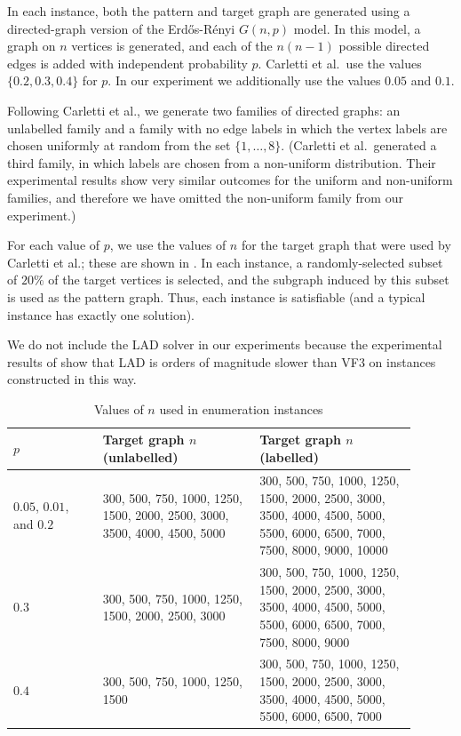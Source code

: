In each instance, both the pattern and target graph are generated using a directed-graph
version of the Erd\H{o}s-Rényi $G(n,p)$ model.  In this model, a graph on $n$ vertices
is generated, and each of the $n(n-1)$ possible directed edges is added with independent
probability $p$.  Carletti et al.\ use the values $\{0.2, 0.3, 0.4\}$ for $p$. In our experiment
we additionally use the values $0.05$ and $0.1$.

Following Carletti et al., we generate two families of directed graphs: an unlabelled family
and a family with no edge labels in which the vertex labels are chosen uniformly at random
from the set $\{1,\dots,8\}$.  (Carletti et al.\ generated a third family, in which labels
are chosen from a non-uniform distribution.  Their experimental results show very similar
outcomes for the uniform and non-uniform families, and therefore we have omitted the non-uniform
family from our experiment.)

For each value of $p$, we use the values
of $n$ for the target graph that were used by Carletti et al.; these are shown in .
In each instance, a randomly-selected subset of $20\%$ of the target vertices is selected,
and the subgraph induced by this subset is used as the pattern graph.  Thus, each instance
is satisfiable (and a typical instance has exactly one solution).

We do not include the LAD solver in our experiments because
the experimental results of \cite{DBLP:journals/pami/CarlettiFSV18} show that LAD
is orders of magnitude slower than VF3 on instances constructed in
this way.

\begin{table}[htb]
\centering
\footnotesize
 \begin{tabular}{p{0.2\linewidth} p{0.35\linewidth} p{0.35\linewidth}}
 \toprule
     $p$ & Target graph $n$ (unlabelled) & Target graph $n$ (labelled) \\ [0.5ex]
 \midrule
     $0.05$, $0.01$, and $0.2$ &
         300, 500, 750, 1000, 1250, 1500, 2000, 2500, 3000, 3500, 4000, 4500, 5000 &
         300, 500, 750, 1000, 1250, 1500, 2000, 2500, 3000, 3500, 4000, 4500, 5000,
         5500, 6000, 6500, 7000, 7500, 8000, 9000, 10000\\
     \rule{0pt}{2.3ex}$0.3$ & 
        300, 500, 750, 1000, 1250, 1500, 2000, 2500, 3000 &
        300, 500, 750, 1000, 1250, 1500, 2000, 2500, 3000, 3500, 4000, 4500, 5000,
        5500, 6000, 6500, 7000, 7500, 8000, 9000 \\
     \rule{0pt}{2.3ex}$0.4$ & 300, 500, 750, 1000, 1250, 1500 &
        300, 500, 750, 1000, 1250, 1500, 2000, 2500, 3000, 3500, 4000, 4500, 5000, 5500, 6000, 6500, 7000 \\
 \bottomrule
\end{tabular}
\caption{Values of $n$ used in enumeration instances}
\label{tab:carletti-n}
\end{table}

